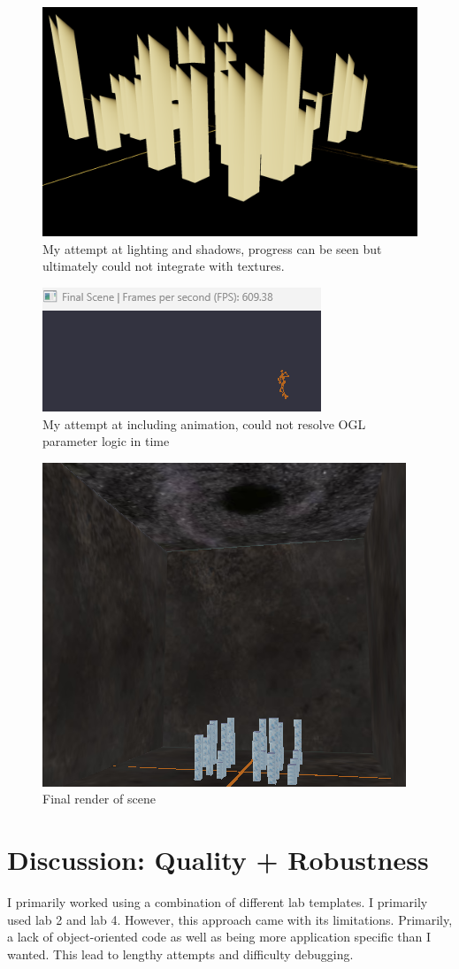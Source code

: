 \begin{figure}
    \centering
    \includegraphics[width=0.5\linewidth]{Results//Progress_screenshots/Screenshot 4 - Lighting & Shadows Attempt.png}
    \caption{My attempt at lighting and shadows, progress can be seen but ultimately could not integrate with textures.}
    \label{fig:enter-label}
\end{figure}
\begin{figure}
    \centering
    \includegraphics[width=0.5\linewidth]{Results//Progress_screenshots/Screenshot 5 - Animation}
    \caption{My attempt at including animation, could not resolve OGL parameter logic in time}
    \label{fig:enter-label}
\end{figure}
\begin{figure}
    \centering
    \includegraphics[width=0.5\linewidth]{Results//Progress_screenshots/Screenshot 6 - Final Render}
    \caption{Final render of scene}
    \label{fig:enter-label}
\end{figure}


\newpage
\chapter{Discussion: Quality + Robustness}
I primarily worked using a combination of different lab templates. I primarily used lab 2 and lab 4. However, this approach came with its limitations. Primarily, a lack of object-oriented code as well as being more application specific than I wanted. This lead to lengthy attempts and difficulty debugging. 

